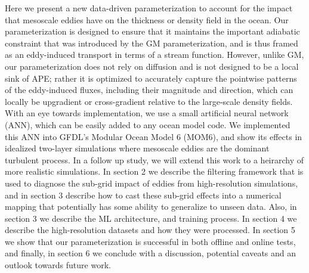 \documentclass[draft]{agujournal2019}
\begin{document}
Here we present a new data-driven parameterization to account for the impact that mesoscale eddies have on the thickness or density field in the ocean. Our parameterization is designed to ensure that it maintains the important adiabatic constraint that was introduced by the GM parameterization, and is thus framed as an eddy-induced transport in terms of a stream function. However, unlike GM, our parameterization does not rely on diffusion and is not designed to be a local sink of APE; rather it is optimized to accurately capture the pointwise patterns of the eddy-induced fluxes, including their magnitude and direction, which can locally be upgradient or cross-gradient relative to the large-scale density fields. With an eye towards implementation, we use a small artificial neural network (ANN), which can be easily added to any ocean model code. We implemented this ANN into GFDL's Modular Ocean Model 6 (MOM6), and show its effects in idealized two-layer simulations where mesoscale eddies are the dominant turbulent process. In a follow up study, we will extend this work to a heirarchy of more realistic simulations.
In section 2 we describe the filtering framework that is used to diagnose the sub-grid impact of eddies from high-resolution simulations, and in section 3 describe how to cast these sub-grid effects into a numerical mapping that potentially has some ability to generalize to unseen data. Also, in section 3 we describe the ML architecture, and training process. 
In section 4 we describe the high-resolution datasets and how they were processed. In section 5 we show that our parameterization is successful in both offline and online tests, and finally, in section 6 we conclude with a discussion, potential caveats and an outlook towards future work. 
\end{document}
